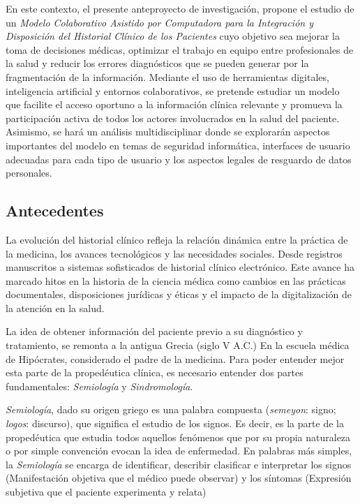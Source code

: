 En este contexto, el presente anteproyecto de investigación, propone el estudio de un \textit{Modelo Colaborativo Asistido por Computadora para la Integración y Disposición del Historial Clínico de los Pacientes} cuyo objetivo sea mejorar la toma de decisiones médicas, optimizar el trabajo en equipo entre profesionales de la salud y reducir los errores diagnósticos que se pueden generar por la fragmentación de la información. Mediante el uso de herramientas digitales, inteligencia artificial y entornos colaborativos, se pretende estudiar un modelo que facilite el acceso oportuno a la información clínica relevante y promueva la participación activa de todos los actores involucrados en la salud del paciente. Asimismo, se hará un análisis multidisciplinar donde se explorarán aspectos importantes del modelo en temas de seguridad informática, interfaces de usuario adecuadas para cada tipo de usuario y los aspectos legales de resguardo de datos personales.

    \subsection{Antecedentes}

    La evolución del historial clínico refleja la relación dinámica entre la práctica de la medicina, los avances tecnológicos y las necesidades sociales. Desde registros manuscritos a sistemas sofisticados de historial clínico electrónico. Este avance ha marcado hitos en la historia de la ciencia médica como cambios en las prácticas documentales, disposiciones jurídicas y éticas y el impacto de la digitalización de la atención en la salud.

    La idea de obtener información del paciente previo a su diagnóstico y tratamiento, se remonta a la antigua Grecia (siglo V A.C.) En la escuela médica de Hipócrates, considerado el padre de la medicina. Para poder entender mejor esta parte de la propedéutica clínica, es necesario entender dos partes fundamentales: \textit{Semiología} y \textit{Sindromología}.

  
    \textit{Semiología}, dado su origen griego es una palabra compuesta (\textit{semeyon}: signo; \textit{logos}: discurso), que significa el estudio de los signos. Es decir, es la parte de la propedéutica que estudia todos aquellos fenómenos que por su propia naturaleza o por simple convención evocan la idea de enfermedad. En palabras más simples, la \textit{Semiología} se encarga de identificar, describir clasificar e interpretar los signos (Manifestación objetiva que el médico puede observar) y los síntomas (Expresión subjetiva que el paciente experimenta y relata)
    
